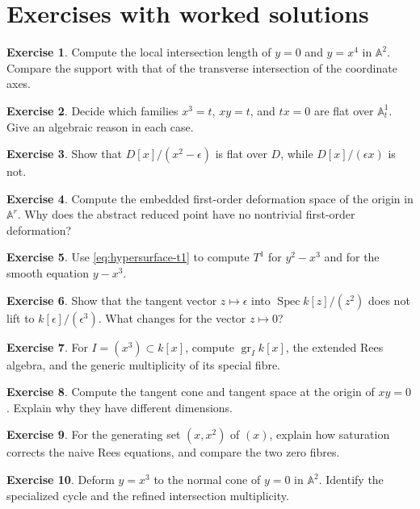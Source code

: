 \documentclass[11pt,a4paper]{article}
\numberwithin{equation}{section}
\theoremstyle{definition}
\newtheorem{exercise}{Exercise}
\newcommand{\A}{\mathbb A}
\newcommand{\Spec}{\operatorname{Spec}}
\newcommand{\gr}{\operatorname{gr}}
\begin{document}
\section{Exercises with worked solutions}
\label{sec:exercises}

\begin{exercise}\label{ex:length}
Compute the local intersection length of $y=0$ and $y=x^4$ in $\A^2$.
Compare the support with that of the transverse intersection of the
coordinate axes.
\end{exercise}
\begin{exercise}\label{ex:flat}
Decide which families $x^3=t$, $xy=t$, and $tx=0$ are flat over
$\A^1_t$. Give an algebraic reason in each case.
\end{exercise}
\begin{exercise}\label{ex:dual}
Show that $D[x]/(x^2-\epsilon)$ is flat over $D$, while
$D[x]/(\epsilon x)$ is not.
\end{exercise}
\begin{exercise}\label{ex:embedded}
Compute the embedded first-order deformation space of the origin in
$\A^r$. Why does the abstract reduced point have no nontrivial
first-order deformation?
\end{exercise}
\begin{exercise}\label{ex:cusp}
Use \eqref{eq:hypersurface-t1} to compute $T^1$ for $y^2-x^3$ and
for the smooth equation $y-x^3$.
\end{exercise}
\begin{exercise}\label{ex:lift}
Show that the tangent vector $z\mapsto\epsilon$ into
$\Spec k[z]/(z^2)$ does not lift to $k[\epsilon]/(\epsilon^3)$.
What changes for the vector $z\mapsto0$?
\end{exercise}
\begin{exercise}\label{ex:fat}
For $I=(x^3)\subset k[x]$, compute $\gr_I k[x]$, the extended Rees
algebra, and the generic multiplicity of its special fibre.
\end{exercise}
\begin{exercise}\label{ex:nodecone}
Compute the tangent cone and tangent space at the origin of
$xy=0$. Explain why they have different dimensions.
\end{exercise}
\begin{exercise}\label{ex:saturation}
For the generating set $(x,x^2)$ of $(x)$, explain how saturation
corrects the naive Rees equations, and compare the two zero fibres.
\end{exercise}
\begin{exercise}\label{ex:tangentcone}
Deform $y=x^3$ to the normal cone of $y=0$ in $\A^2$. Identify the
specialized cycle and the refined intersection multiplicity.
\end{exercise}
\end{document}
